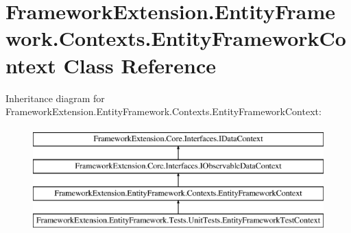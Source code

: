 \hypertarget{class_framework_extension_1_1_entity_framework_1_1_contexts_1_1_entity_framework_context}{\section{Framework\-Extension.\-Entity\-Framework.\-Contexts.\-Entity\-Framework\-Context Class Reference}
\label{class_framework_extension_1_1_entity_framework_1_1_contexts_1_1_entity_framework_context}
}
Inheritance diagram for Framework\-Extension.\-Entity\-Framework.\-Contexts.\-Entity\-Framework\-Context\-:\begin{figure}[H]
\begin{center}
\leavevmode
\includegraphics[height=4.000000cm]{class_framework_extension_1_1_entity_framework_1_1_contexts_1_1_entity_framework_context}
\end{center}
\end{figure}
